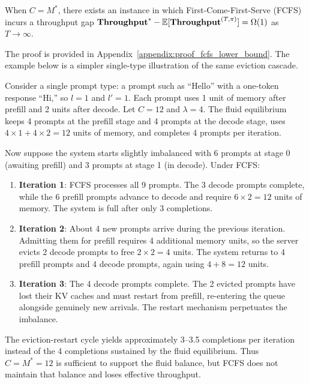 \begin{proposition}\label{prop:lower_bound_FCFS}
When \(C=M^*\), there exists an instance in which First-Come-First-Serve (FCFS) incurs a throughput gap \(\textbf{Throughput}^* - \mathbb{E}[\textbf{Throughput}^{(T,\pi)}] = \Omega(1)\) as \(T \to \infty\).
\end{proposition}

The proof is provided in Appendix~\ref{appendix:proof_fcfs_lower_bound}. The example below is a simpler single-type illustration of the same eviction cascade.

\begin{example}
\label{ex:fcfs_cascade}
Consider a single prompt type: a prompt such as ``Hello'' with a one-token response ``Hi,'' so \(l=1\) and \(l'=1\). Each prompt uses 1 unit of memory after prefill and 2 units after decode. Let \(C=12\) and \(\lambda=4\). The fluid equilibrium keeps 4 prompts at the prefill stage and 4 prompts at the decode stage, uses \(4 \times 1 + 4 \times 2 = 12\) units of memory, and completes 4 prompts per iteration.

Now suppose the system starts slightly imbalanced with 6 prompts at stage 0 (awaiting prefill) and 3 prompts at stage 1 (in decode). Under FCFS:
\begin{enumerate}
    \item \textbf{Iteration 1}: FCFS processes all 9 prompts. The 3 decode prompts complete, while the 6 prefill prompts advance to decode and require \(6 \times 2 = 12\) units of memory. The system is full after only 3 completions.
    \item \textbf{Iteration 2}: About 4 new prompts arrive during the previous iteration. Admitting them for prefill requires 4 additional memory units, so the server evicts 2 decode prompts to free \(2 \times 2 = 4\) units. The system returns to 4 prefill prompts and 4 decode prompts, again using \(4+8=12\) units.
    \item \textbf{Iteration 3}: The 4 decode prompts complete. The 2 evicted prompts have lost their KV caches and must restart from prefill, re-entering the queue alongside genuinely new arrivals. The restart mechanism perpetuates the imbalance.
\end{enumerate}
The eviction-restart cycle yields approximately 3--3.5 completions per iteration instead of the 4 completions sustained by the fluid equilibrium. Thus \(C=M^*=12\) is sufficient to support the fluid balance, but FCFS does not maintain that balance and loses effective throughput.
\end{example}

